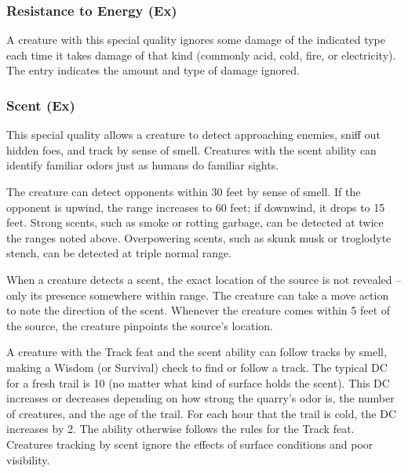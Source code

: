 {\subsubsection{Resistance to Energy (Ex)} A creature with this special quality ignores some damage of the indicated type each time it takes damage of that kind (commonly acid, cold, fire, or electricity). The entry indicates the amount and type of damage ignored.

\subsubsection{Scent (Ex)} This special quality allows a creature to detect approaching enemies, sniff out hidden foes, and track by sense of smell. Creatures with the scent ability can identify familiar odors just as humans do familiar sights.

The creature can detect opponents within 30 feet by sense of smell. If the opponent is upwind, the range increases to 60 feet; if downwind, it drops to 15 feet. Strong scents, such as smoke or rotting garbage, can be detected at twice the ranges noted above. Overpowering scents, such as skunk musk or troglodyte stench, can be detected at triple normal range.

When a creature detects a scent, the exact location of the source is not revealed -- only its presence somewhere within range. The creature can take a move action to note the direction of the scent. Whenever the creature comes within 5 feet of the source, the creature pinpoints the source's location.

A creature with the Track feat and the scent ability can follow tracks by smell, making a Wisdom (or Survival) check to find or follow a track. The typical DC for a fresh trail is 10 (no matter what kind of surface holds the scent). This DC increases or decreases depending on how strong the quarry's odor is, the number of creatures, and the age of the trail. For each hour that the trail is cold, the DC increases by 2. The ability otherwise follows the rules for the Track feat. Creatures tracking by scent ignore the effects of surface conditions and poor visibility. 

}
